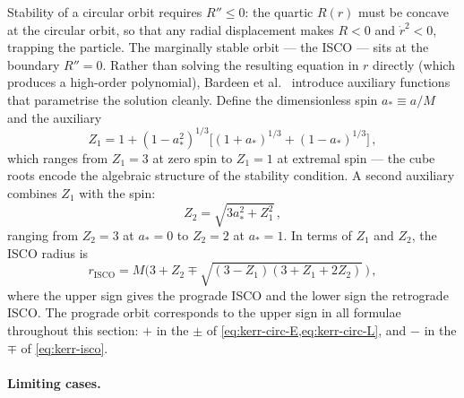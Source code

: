 Stability of a circular orbit requires $R'' \leq 0$: the quartic
$R(r)$ must be concave at the circular orbit, so that any radial
displacement makes $R < 0$ and $\dot{r}^2 < 0$, trapping the
particle.  The marginally stable orbit --- the ISCO --- sits
at the boundary $R'' = 0$.  Rather than solving the resulting
equation in $r$ directly (which produces a high-order polynomial),
Bardeen et al.\ \cite{Bardeen1972} introduce auxiliary functions
that parametrise the solution cleanly.  Define the dimensionless
spin $a_* \equiv a/M$ and the auxiliary
%
\begin{equation}
  Z_1 = 1 + (1 - a_*^2)^{1/3}
    \bigl[(1 + a_*)^{1/3} + (1 - a_*)^{1/3}\bigr] \,,
  \label{eq:kerr-Z1}
\end{equation}
%
which ranges from $Z_1 = 3$ at zero spin to $Z_1 = 1$ at extremal
spin --- the cube roots encode the algebraic structure of the
stability condition.  A second auxiliary combines $Z_1$ with the
spin:
%
\begin{equation}
  Z_2 = \sqrt{3a_*^2 + Z_1^2} \,,
  \label{eq:kerr-Z2}
\end{equation}
%
ranging from $Z_2 = 3$ at $a_* = 0$ to $Z_2 = 2$ at $a_* = 1$.
In terms of $Z_1$ and $Z_2$, the ISCO radius is
%
\begin{equation}
  r_{\text{ISCO}} = M\bigl(3 + Z_2 \mp
    \sqrt{(3 - Z_1)(3 + Z_1 + 2Z_2)}\,\bigr) \,,
  \label{eq:kerr-isco}
\end{equation}
%
where the upper sign gives the prograde ISCO and the lower sign
the retrograde ISCO.  The prograde orbit corresponds to the upper
sign in all formulae throughout this section: $+$ in the $\pm$ of
\cref{eq:kerr-circ-E,eq:kerr-circ-L}, and $-$ in the $\mp$ of
\cref{eq:kerr-isco}.

\paragraph{Limiting cases.}

